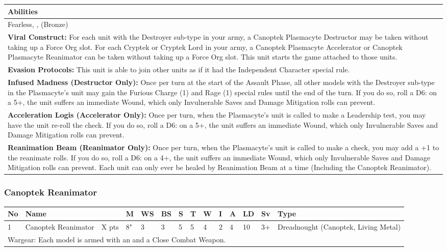 \noindent
\begin{tabular}{||m{532pt}||}
	\hline
	Abilities \\
	\hline
	Fearless, \quickref{Reanimation Protocols}, \quickref{Soulless Hordes} (Bronze) \\
	\textbf{Viral Construct:} For each unit with the Destroyer sub-type in your army, a Canoptek Plasmacyte Destructor may be taken without taking up a Force Org slot. For each Cryptek or Cryptek Lord in your army, a Canoptek Plasmacyte Accelerator or Canoptek Plasmacyte Reanimator can be taken without taking up a Force Org slot. This unit starts the game attached to those units. \\
	\textbf{Evasion Protocols:} This unit is able to join other units as if it had the Independent Character special rule. \\
	\textbf{Infused Madness (Destructor Only):} Once per turn at the start of the Assault Phase, all other models with the Destroyer sub-type in the Plasmacyte's unit may gain the Furious Charge (1) and Rage (1) special rules until the end of the turn. If you do so, roll a D6: on a 5+, the unit suffers an immediate Wound, which only Invulnerable Saves and Damage Mitigation rolls can prevent. \\
	\textbf{Acceleration Logis (Accelerator Only):} Once per turn, when the Plasmacyte's unit is called to make a Leadership test, you may have the unit re-roll the check. If you do so, roll a D6: on a 5+, the unit suffers an immediate Wound, which only Invulnerable Saves and Damage Mitigation rolls can prevent. \\
	\textbf{Reanimation Beam (Reanimator Only):} Once per turn, when the Plasmacyte's unit is called to make a \quickref{Reanimation Protocols} check, you may add a +1 to the reanimate rolls. If you do so, roll a D6: on a 4+, the unit suffers an immediate Wound, which only Invulnerable Saves and Damage Mitigation rolls can prevent. Each unit can only ever be healed by Reanimation Beam at a time (Including the Canoptek Reanimator).\\
	\hline
\end{tabular}


\newpage
\subsubsection{Canoptek Reanimator}

\noindent
\begin{tabular}{||m{10pt} m{90pt} m{30pt} m{11pt} m{11pt} m{11pt} m{11pt} m{11pt} m{11pt} m{11pt} m{11pt} m{11pt} m{11pt} m{135pt}||}
	\hline
	No & Name & & M & WS & BS & S & T & W & I & A & LD & Sv & Type \\
	\hline
	1 & Canoptek Reanimator & X pts & 8" & 3 & 3 & 5 & 5 & 4 & 2 & 4 & 10 & 3+ & Dreadnought (Canoptek, Living Metal) \\
	\hline
	\hline
	\multicolumn{14}{||Z{532 pt}||}{Wargear: Each model is armed with an \quickref{Atomiser Beam Lance} and a Close Combat Weapon.} \\
	\hline
\end{tabular}

